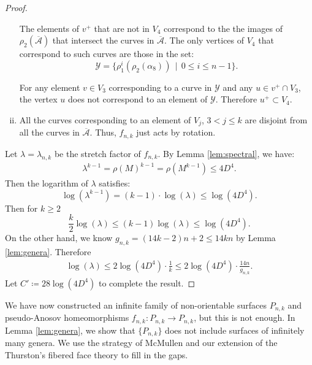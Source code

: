 \begin{proof}
\begin{enumerate}[(i)]
The elements of $v^+$ that are not in $V_4$ correspond to the the images of $\rho_2(\overline{\mathcal{A}})$ that intersect the curves in $\overline{\mathcal{A}}$.
The only vertices of $V_4$ that correspond to such curves are those in the set:
 $$\mathcal{Y}=\{\rho_1^i(\rho_2(\alpha_8))\,\mid\,0\leq i\leq n-1\}.$$ %
 

  For any element $v \in V_3$ corresponding to a curve in $\mathcal{Y}$ and any
  $u \in v^+ \cap V_3$, the vertex $u$ does not correspond to an element of $\mathcal{Y}$.  Therefore $u^+ \subset V_4$.
\item All the curves corresponding to an element of $V_j$, $3 < j \leq k$ are disjoint from all the curves in
  $\overline{\mathcal{A}}$. Thus, $f_{n,k}$ just acts by rotation.
\end{enumerate}

Let $\lambda = \lambda_{n,k}$ be the stretch factor of $f_{n,k}$.  By Lemma \ref{lem:spectral}, we have:
\begin{gather*}
    \lambda^{k-1} = \rho(M)^{k-1} = \rho(M^{k-1}) \leq 4D^4. 
\end{gather*}
Then the logarithm of $\lambda$ satisfies:
$$\log(\lambda^{k-1})=(k-1)\cdot \log(\lambda) \leq \log(4D^4).$$
Then for $k\geq 2$
    $$\frac{k}{2}\log(\lambda) \leq (k-1)\log(\lambda) \leq \log(4D^4).$$
On the other hand, we know $g_{n,k} = (14k - 2)n + 2 \leq 14kn$ by Lemma \ref{lem:genera}. Therefore
\begin{align*}
    \log(\lambda) \leq 2\log(4D^4)\cdot\frac{1}{k} \leq 2\log(4D^4)\cdot \frac{14n}{g_{n,k}}.
\end{align*}
Let $C' \coloneqq 28\log(4D^4)$ to complete the result.
\end{proof}


We have now constructed an infinite family of non-orientable surfaces $P_{n,k}$ and pseudo-Anosov homeomorphisms $f_{n,k}:P_{n,k}\to P_{n,k}$, but this is not
enough. In Lemma \ref{lem:genera}, we show that $\{P_{n,k}\}$ does not include surfaces of infinitely many genera. We use the strategy of McMullen \cite{mcmullen2000polynomial} and our extension of the Thurston's
fibered face theory to fill in the gaps. %

